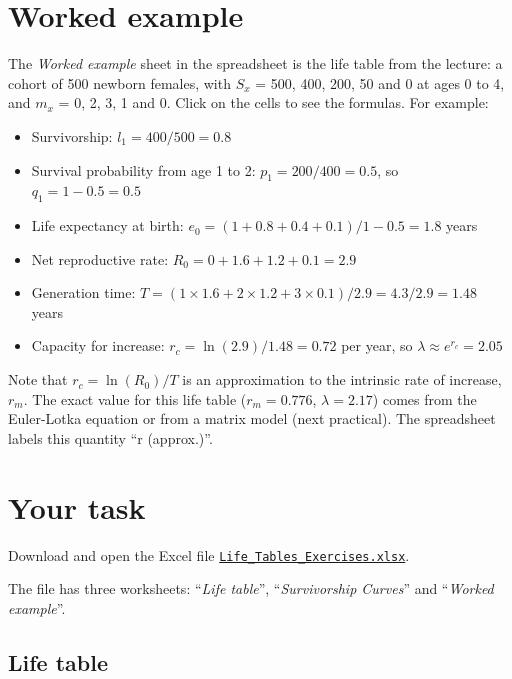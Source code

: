 \documentclass[
  a4paper]{book}
\providecommand{\tightlist}{%
  \setlength{\itemsep}{0pt}\setlength{\parskip}{0pt}}
\begin{document}
\section{Worked example}\label{worked-example-6}

The \emph{Worked example} sheet in the spreadsheet is the life table from the lecture: a cohort of 500 newborn females, with \(S_x\) = 500, 400, 200, 50 and 0 at ages 0 to 4, and \(m_x\) = 0, 2, 3, 1 and 0. Click on the cells to see the formulas. For example:

\begin{itemize}
\tightlist
\item
  Survivorship: \(l_1 = 400/500 = 0.8\)
\item
  Survival probability from age 1 to 2: \(p_1 = 200/400 = 0.5\), so \(q_1 = 1 - 0.5 = 0.5\)
\item
  Life expectancy at birth: \(e_0 = (1 + 0.8 + 0.4 + 0.1)/1 - 0.5 = 1.8\) years
\item
  Net reproductive rate: \(R_0 = 0 + 1.6 + 1.2 + 0.1 = 2.9\)
\item
  Generation time: \(T = (1 \times 1.6 + 2 \times 1.2 + 3 \times 0.1)/2.9 = 4.3/2.9 = 1.48\) years
\item
  Capacity for increase: \(r_c = \ln(2.9)/1.48 = 0.72\) per year, so \(\lambda \approx e^{r_c} = 2.05\)
\end{itemize}

Note that \(r_c = \ln(R_0)/T\) is an approximation to the intrinsic rate of increase, \(r_m\). The exact value for this life table (\(r_m = 0.776\), \(\lambda = 2.17\)) comes from the Euler-Lotka equation or from a matrix model (next practical). The spreadsheet labels this quantity ``r (approx.)''.

\section{Your task}\label{your-task-7}

Download and open the Excel file \href{https://www.dropbox.com/scl/fi/rriwgom15g2i6mtvm7p77/Life_Tables_Exercises.xlsx?rlkey=09zk9ilepb1sa4bngi8dmdrwc&dl=1}{\texttt{Life\_Tables\_Exercises.xlsx}}.

The file has three worksheets: ``\emph{Life table}'', ``\emph{Survivorship Curves}'' and ``\emph{Worked example}''.

\subsection{Life table}\label{life-table}
\end{document}
